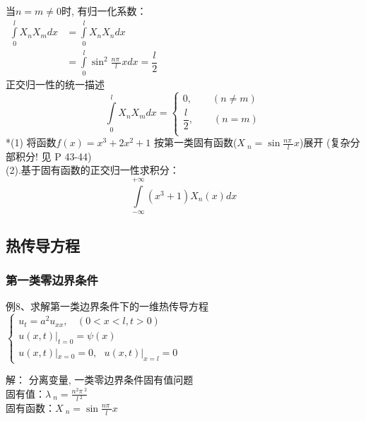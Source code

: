 \begin{frame}
	\frametitle{}	
	当$n= m \ne 0$时, 有归一化系数： \\   
	$ \begin{array}{llll}
		\int\limits_{0 }^{l}  X_n X_m dx&= \int\limits_{0 }^{l}  X_n X_n dx \\
		&= \int\limits_{0 }^{l}   \sin ^2  \frac{n\pi~}{l} x dx =  \dfrac{l}{2} 
	\end{array}$ \\ \vspace*{1em}
    正交归一性的统一描述
    \begin{equation*}
        \int\limits_{0 }^{l}  X_n X_m dx =
        \begin{cases}
         0, \qquad (n \not = m) \\ 
         \dfrac{l}{2} , \qquad (n =m) \\ 
        \end{cases} 
    \end{equation*}  
    *(1) 将函数$f(x)=x^3+2x^2 +1$ 按第一类固有函数($X~_n= \sin \frac{n\pi~}{l} x  $)展开 (复杂分部积分! 见 P 43-44)\\
    (2).基于固有函数的正交归一性求积分：
  \[ \int\limits_{-\infty}^{+\infty} (x^3 +1) X_n(x) d x \]
\end{frame}	

\subsection{热传导方程}

\begin{frame}
	\frametitle{第一类零边界条件}	
	\begin{exampleblock} {例8、求解第一类边界条件下的一维热传导方程}
	$\displaystyle \begin{cases}
		u_{t}=a^2u_{xx} ,~~~~ (0<x<l, t>0)\\
		u(x,t)|_{t=0}= \psi (x)  \\
		u(x,t)|_{x=0}= 0, ~~~  u(x,t)|_{x=l}= 0 
	\end{cases}$ \\
	\end{exampleblock}
	\alert{解：} 分离变量, 一类零边界条件固有值问题 \\ 
    固有值：$\displaystyle  \lambda~_n=\frac{n^2\pi~^2}{l~^2}$ \\ 
	固有函数：{$\displaystyle  X~_n= \sin \frac{n\pi~}{l} x$}\\
\end{frame}	

